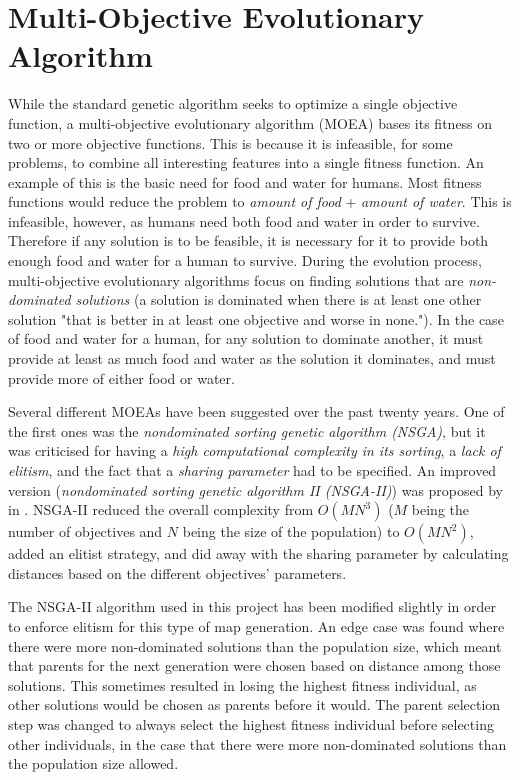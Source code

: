 \section{Multi-Objective Evolutionary Algorithm}
\label{methodology_moea}
While the standard genetic algorithm seeks to optimize a single objective function, a multi-objective evolutionary algorithm (MOEA) bases its fitness on two or more objective functions. This is because it is infeasible, for some problems, to combine all interesting features into a single fitness function. An example of this is the basic need for food and water for humans. Most fitness functions would reduce the problem to \textit{amount of food} + \textit{amount of water}. This is infeasible, however, as humans need both food and water in order to survive. Therefore if any solution is to be feasible, it is necessary for it to provide both enough food and water for a human to survive. During the evolution process, multi-objective evolutionary algorithms focus on finding solutions that are \textit{non-dominated solutions} (a solution is dominated when there is at least one other solution "that is better in at least one objective and worse in none."\cite{Togelius2013Controllable}). In the case of food and water for a human, for any solution to dominate another, it must provide at least as much food and water as the solution it dominates, and must provide more of either food or water.

Several different MOEAs have been suggested over the past twenty years\cite{Deb2001Multi, Fonseca1993Genetic, Srinivas1994Muiltiobjective}. One of the first ones was the \textit{nondominated sorting genetic algorithm (NSGA)}\cite{Srinivas1994Muiltiobjective}, but it was criticised for having a \textit{high computational complexity in its sorting}, a \textit{lack of elitism}, and the fact that a \textit{sharing parameter} had to be specified. An improved version (\textit{nondominated sorting genetic algorithm II (NSGA-II)}) was proposed by \citeauthor{Deb2000Fast}\cite{Deb2000Fast} in \citeyear{Deb2000Fast}. NSGA-II reduced the overall complexity from $O(M N^3)$ ($M$ being the number of objectives and $N$ being the size of the population) to $O(M N^2)$, added an elitist strategy, and did away with the sharing parameter by calculating distances based on the different objectives' parameters.

The NSGA-II algorithm used in this project has been modified slightly in order to enforce elitism for this type of map generation. An edge case was found where there were more non-dominated solutions than the population size, which meant that parents for the next generation were chosen based on distance among those solutions. This sometimes resulted in losing the highest fitness individual, as other solutions would be chosen as parents before it would. The parent selection step was changed to always select the highest fitness individual before selecting other individuals, in the case that there were more non-dominated solutions than the population size allowed.

